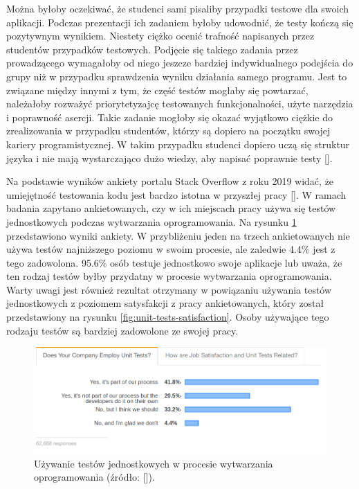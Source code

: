 Można byłoby oczekiwać, że studenci sami pisaliby przypadki testowe dla swoich aplikacji. 
Podczas prezentacji ich zadaniem byłoby udowodnić, że testy kończą się pozytywnym wynikiem.
Niestety ciężko ocenić trafność napisanych przez studentów przypadków testowych.
Podjęcie się takiego zadania przez prowadzącego wymagałoby od niego jeszcze bardziej indywidualnego podejścia do grupy niż w przypadku sprawdzenia wyniku działania samego programu.
Jest to związane między innymi z tym, że część testów mogłaby się powtarzać, należałoby rozważyć priorytetyzajcę testowanych funkcjonalności, użyte narzędzia i poprawność asercji.
Takie zadanie mogłoby się okazać wyjątkowo ciężkie do zrealizowania w przypadku studentów, którzy są dopiero na początku swojej kariery programistycznej.
W takim przypadku studenci dopiero uczą się struktur języka i nie mają wystarczająco dużo wiedzy, aby napisać poprawnie testy [].

Na podstawie wyników ankiety portalu Stack Overflow z roku 2019 widać, że umiejętność testowania kodu jest bardzo istotna w przyszłej pracy [].
W ramach badania zapytano ankietowanych, czy w ich miejscach pracy używa się testów jednostkowych podczas wytwarzania oprogramowania.
Na rysunku \ref{fig:unit-tests-use} przedstawiono wyniki ankiety.
W przybliżeniu jeden na trzech ankietowanych nie używa testów najniższego poziomu w swoim procesie, ale zaledwie 4.4\% jest z tego zadowolona.
95.6\% osób testuje jednostkowo swoje aplikacje lub uważa, że ten rodzaj testów byłby przydatny w procesie wytwarzania oprogramowania. 
Warty uwagi jest również rezultat otrzymany w powiązaniu używania testów jednostkowych z poziomem satysfakcji z pracy ankietowanych, który został przedstawiony na rysunku \ref{fig:unit-tests-satisfaction}.
Osoby używające tego rodzaju testów są bardziej zadowolone ze swojej pracy.

\begin{figure}[h]
    \centering
    \includegraphics[width = 13cm]{chapter01/unit-tests-use.png}
    \caption{Używanie testów jednostkowych w procesie wytwarzania oprogramowania (źródło: []).}
    \label{fig:unit-tests-use}
\end{figure}

